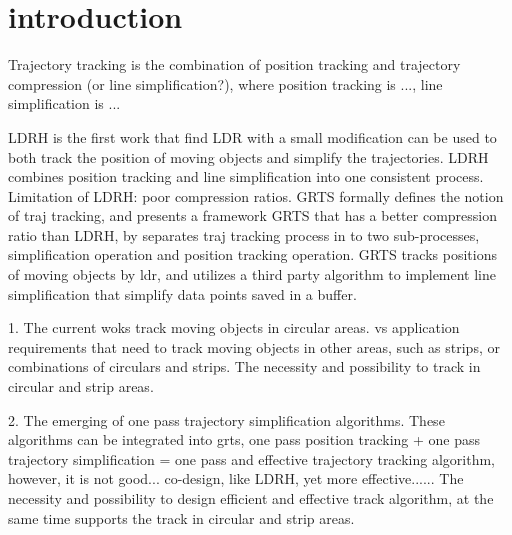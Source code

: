 

\section{introduction}
\label{sec-intro}


Trajectory tracking \cite{Lange:Tracking} is the combination of position tracking \cite{Wolfson:PositionTracking} and trajectory compression (or line simplification?), where position tracking is ..., line simplification is ...

LDRH is the first work that find LDR with a small modification can be used to both track the position of moving objects and simplify the trajectories. LDRH combines position tracking and line simplification into one consistent process. Limitation of LDRH: poor compression ratios. 
GRTS formally defines the notion of traj tracking, and presents a framework GRTS that has a better compression ratio than LDRH, by separates traj tracking process in to two sub-processes, simplification operation and position tracking operation. GRTS tracks positions of moving objects by ldr, and utilizes a third party algorithm to implement line simplification that simplify data points saved in a buffer.



1. The current woks track moving objects in circular areas. vs application requirements that need to track moving objects in other areas, such as strips, or combinations of circulars and strips.
The necessity and possibility to track in circular and strip areas.


2. The emerging of one pass trajectory simplification algorithms. These algorithms can be integrated into grts, one pass position tracking + one pass trajectory simplification = one pass and effective trajectory tracking algorithm, however, it is not good... co-design, like LDRH, yet more effective...... 
The necessity and possibility to design efficient and effective track algorithm, at the same time supports the track in circular and strip areas.


